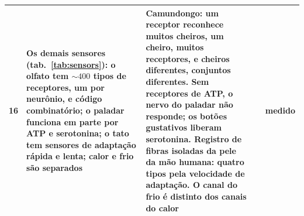 {\begin{longtable}{>{\raggedright}p{0.5cm}>{\raggedright}p{4.0cm}>{\raggedright}p{5.6cm}>{\raggedright}p{2.3cm}>{\raggedright\arraybackslash}p{1.7cm}}
16 & Os demais sensores (tab.~\ref{tab:sensors}): o olfato tem $\sim400$ tipos de receptores, um por neurônio, e código combinatório; o paladar funciona em parte por ATP e serotonina; o tato tem sensores de adaptação rápida e lenta; calor e frio são separados & Camundongo: um receptor reconhece muitos cheiros, um cheiro, muitos receptores, e cheiros diferentes, conjuntos diferentes. Sem receptores de ATP, o nervo do paladar não responde; os botões gustativos liberam serotonina. Registro de fibras isoladas da pele da mão humana: quatro tipos pela velocidade de adaptação. O canal do frio é distinto dos canais do calor & \cite{Mombaerts2004,Malnic1999,Finger2005,Huang2005,JohanssonVallbo1979,McKemy2002} & medido \\
\bottomrule
\end{longtable}}

